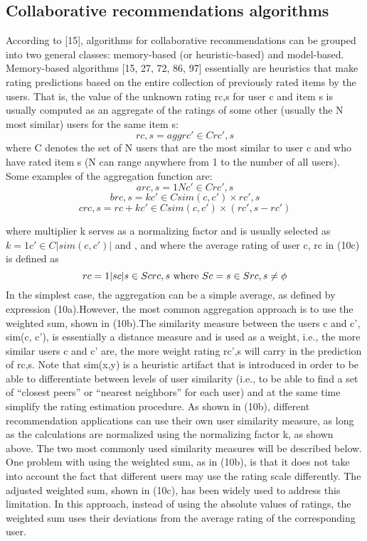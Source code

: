 \subsection{Collaborative recommendations algorithms}
According to [15], algorithms for collaborative recommendations can be grouped into two general classes: memory-based (or heuristic-based) and model-based. Memory-based algorithms [15, 27, 72, 86, 97] essentially are heuristics that make rating predictions based on the entire collection of previously rated items by the users. That is, the value of the unknown rating rc,s for user c and item s is usually computed as an aggregate of the ratings of some other (usually the N most similar) users for the same item s:
\begin{equation}\label{eq:9}
rc,s=aggrc'∈C rc',s 
\end{equation}
where C denotes the set of N users that are the most similar to user c and who have rated item s (N can range anywhere from 1 to the number of all users). Some examples of the aggregation function are:
\begin{equation}\label{eq:10.a}
arc,s= 1Nc'\in Crc',s 
\end{equation}
\begin{equation}\label{eq:10.b}
brc,s= kc'\in Csim(c,c')×rc',s 
\end{equation}
\begin{equation}\label{eq:10.c}
crc,s=rc+ kc'\in Csim(c,c')×(rc',s- rc')
\end{equation}

where multiplier k serves as a normalizing factor and is usually selected as $k= 1c'\in C|sim(c,c')|$ and , and where the average rating of user c, rc in (10c) is defined as
\begin{equation}\label{eq:11}
rc=1|sc|s\in Scrc,s$ where $Sc=s\in S rc,s\neq \phi
\end{equation}
In the simplest case, the aggregation can be a simple average, as defined by expression (10a).However, the most common aggregation approach is to use the weighted sum, shown in (10b).The similarity measure between the users c and c’, sim(c, c’), is essentially a distance measure and is used as a weight, i.e., the more similar users c and c’ are, the more weight rating rc’,s will carry in the prediction of rc,s. Note that sim(x,y) is a heuristic artifact that is introduced in order to be able to differentiate between levels of user similarity (i.e., to be able to find a set of “closest peers” or “nearest neighbors” for each user) and at the same time simplify the rating estimation procedure. As shown in (10b), different recommendation applications can use their own user similarity measure, as long as the calculations are normalized using the normalizing factor k, as shown above. The two most commonly used similarity measures will be described below. One problem with using the weighted sum, as in (10b), is that it does not take into account the fact that different users may use the rating scale differently. The adjusted weighted sum, shown in (10c), has been widely used to address this limitation. In this approach, instead of using the absolute values of ratings, the weighted sum uses their deviations from the average rating of the corresponding user.


